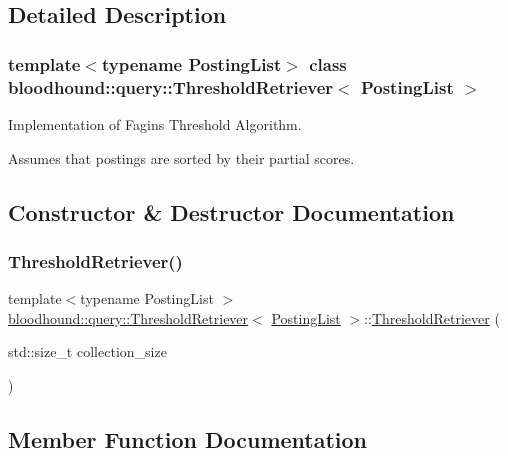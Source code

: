 \subsection{Detailed Description}
\subsubsection*{template$<$typename Posting\+List$>$\newline
class bloodhound\+::query\+::\+Threshold\+Retriever$<$ Posting\+List $>$}

Implementation of Fagin\textquotesingle{}s Threshold Algorithm.

Assumes that postings are sorted by their partial scores. 

\subsection{Constructor \& Destructor Documentation}
\mbox{\label{classbloodhound_1_1query_1_1ThresholdRetriever_a425d17d048e1fd3fd8157450c99df5bc}} 
\subsubsection{\texorpdfstring{Threshold\+Retriever()}{ThresholdRetriever()}}
{\footnotesize\ttfamily template$<$typename Posting\+List $>$ \\
\mbox{\hyperlink{classbloodhound_1_1query_1_1ThresholdRetriever}{bloodhound\+::query\+::\+Threshold\+Retriever}}$<$ \mbox{\hyperlink{classbloodhound_1_1PostingList}{Posting\+List}} $>$\+::\mbox{\hyperlink{classbloodhound_1_1query_1_1ThresholdRetriever}{Threshold\+Retriever}} (\begin{DoxyParamCaption}\item[{std\+::size\+\_\+t}]{collection\+\_\+size }\end{DoxyParamCaption})\hspace{0.3cm}{\ttfamily [inline]}}



\subsection{Member Function Documentation}
\mbox{\label{classbloodhound_1_1query_1_1ThresholdRetriever_a06750450e1246e755ebad2d5dac6e8a8}} 
